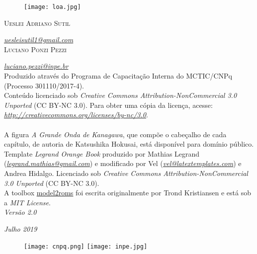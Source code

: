 \newpage
\thispagestyle{empty}

\begin{figure}[H]
    \centering
    \vspace*{\fill}
    \texttt{[image: loa.jpg]}
    \vspace{2.7cm}
\end{figure}


\noindent \textsc{Ueslei Adriano Sutil}

\noindent \textcolor{bleu_cite}{\href{uesleisutil1@gmail.com}{\textit{uesleisutil1@gmail.com}}} \\ %

\noindent \textsc{Luciano Ponzi Pezzi}

\noindent \textcolor{bleu_cite}{\href{luciano.pezzi@inpe.br}{\textit{luciano.pezzi@inpe.br}}} \\ %

\noindent Produzido através do Programa de Capacitação Interna do MCTIC/CNPq (Processo 301110/2017-4). \\

\noindent Conteúdo licenciado sob \textit{Creative Commons Attribution-NonCommercial 3.0 Unported} (CC BY-NC 3.0). Para obter uma cópia da licença, acesse: \textcolor{bleu_cite}{\href{http://creativecommons.org/licenses/by-nc/3.0}{\textit{http://creativecommons.org/licenses/by-nc/3.0}}}. \\\\ A figura \textit{A Grande Onda de Kanagawa}, que compõe o cabeçalho de cada capítulo, de autoria de Katsushika Hokusai, está disponível para domínio público.\\

\noindent Template \textit{Legrand Orange Book} produzido por Mathias Legrand (\textcolor{bleu_cite}{\href{legrand.mathias@gmail.com}{\textit{legrand.mathias@gmail.com}}}) e modificado por Vel (\textcolor{bleu_cite}{\href{vel@latextemplates.com}{\textit{vel@latextemplates.com}}}) e Andrea Hidalgo. Licenciado sob \textit{Creative Commons Attribution-NonCommercial 3.0 Unported} (CC BY-NC 3.0).\\

\noindent A toolbox \textcolor{bleu_cite}{\href{https://github.com/trondkr/model2roms}{model2roms}} foi escrita originalmente por Trond Kristiansen e está sob a \textit{MIT License}. \\

\noindent \textit{Versão 2.0}  %

\noindent \textit{Julho 2019} \\ %

\begin{figure}[H]
    \centering
    \vspace*{\fill}
    \texttt{[image: cnpq.png]}
    \hspace{9.2cm}
    \texttt{[image: inpe.jpg]}
\end{figure}
